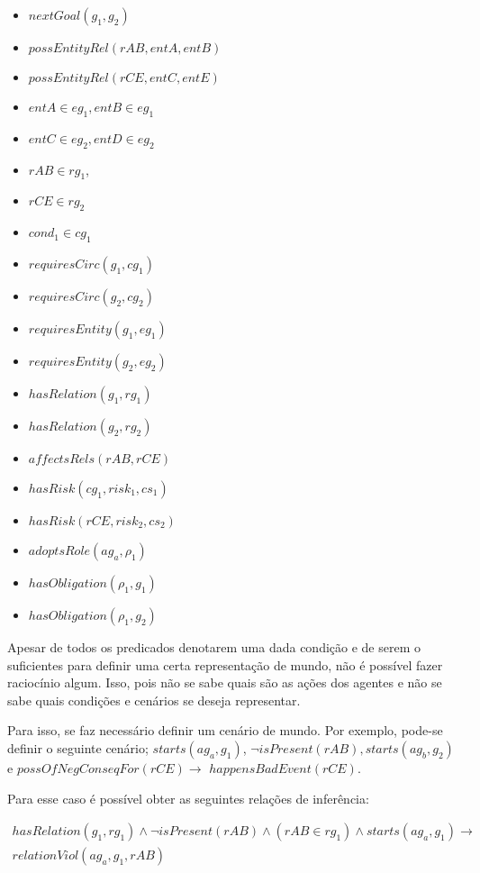 \begin{itemize}
    \item $nextGoal(g_1,g_2)$
    \item $possEntityRel(rAB,entA,entB)$
    \item $possEntityRel(rCE,entC,entE)$
    \item $entA \in eg_1 ,entB \in eg_1$
    \item $entC \in eg_2, entD \in eg_2$
    \item $rAB \in rg_1$,
    \item $rCE \in rg_2 $
    \item $cond_1 \in {cg_1} $
    \item $ requiresCirc(g_1,cg_1)$
    \item $ requiresCirc(g_2,cg_2 )$
    \item $ requiresEntity(g_1,eg_1) $
    \item $ requiresEntity(g_2,eg_2) $
    \item $ hasRelation(g_1, rg_1 )$
    \item $ hasRelation(g_2, rg_2)$ 
    \item $ affectsRels(rAB,rCE) $ 
    \item $hasRisk(cg_1,risk_1,cs_1)$
    \item $hasRisk(rCE,risk_2,cs_2)$
    \item $adoptsRole(ag_a,\rho_1)$
    \item $hasObligation(\rho_1,g_1)$
    \item $hasObligation(\rho_1,g_2)$
\end{itemize}

Apesar de todos os predicados denotarem uma dada condição e de serem o suficientes para definir uma certa representação de mundo, não é possível fazer raciocínio algum. Isso, pois não se sabe quais são as ações dos agentes e não se sabe quais condições e cenários se deseja representar.  

Para isso, se faz necessário definir um cenário de mundo. Por exemplo, pode-se definir o seguinte cenário; $starts(ag_a,g_1)$, $\neg isPresent(rAB), starts(ag_b,g_2)$ e $ possOfNegConseqFor(rCE) \to $ $happensBadEvent(rCE)$. 

Para esse caso é possível obter as seguintes relações de inferência: 

\begin{eqnarray}
    hasRelation(g_1,rg_1)\wedge \neg isPresent(rAB) \wedge (rAB \in rg_1) \wedge starts(ag_a,g_1) \to \nonumber \\
    relationViol(ag_a,g_1,rAB) 
\end{eqnarray}

